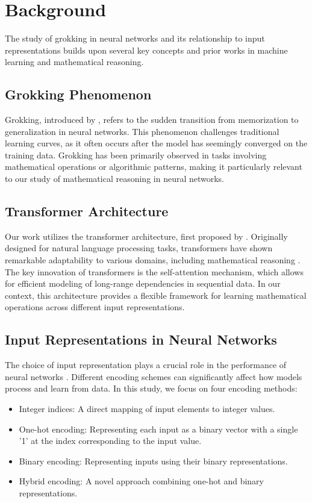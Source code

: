 \documentclass{article} %
\begin{document}
\section{Background}
\label{sec:background}

The study of grokking in neural networks and its relationship to input representations builds upon several key concepts and prior works in machine learning and mathematical reasoning.

\subsection{Grokking Phenomenon}
Grokking, introduced by \citet{power2022grokking}, refers to the sudden transition from memorization to generalization in neural networks. This phenomenon challenges traditional learning curves, as it often occurs after the model has seemingly converged on the training data. Grokking has been primarily observed in tasks involving mathematical operations or algorithmic patterns, making it particularly relevant to our study of mathematical reasoning in neural networks.

\subsection{Transformer Architecture}
Our work utilizes the transformer architecture, first proposed by \citet{vaswani2017attention}. Originally designed for natural language processing tasks, transformers have shown remarkable adaptability to various domains, including mathematical reasoning \cite{radford2019language}. The key innovation of transformers is the self-attention mechanism, which allows for efficient modeling of long-range dependencies in sequential data. In our context, this architecture provides a flexible framework for learning mathematical operations across different input representations.

\subsection{Input Representations in Neural Networks}
The choice of input representation plays a crucial role in the performance of neural networks \cite{goodfellow2016deep}. Different encoding schemes can significantly affect how models process and learn from data. In this study, we focus on four encoding methods:

\begin{itemize}
    \item Integer indices: A direct mapping of input elements to integer values.
    \item One-hot encoding: Representing each input as a binary vector with a single '1' at the index corresponding to the input value.
    \item Binary encoding: Representing inputs using their binary representations.
    \item Hybrid encoding: A novel approach combining one-hot and binary representations.
\end{itemize}
\end{document}
